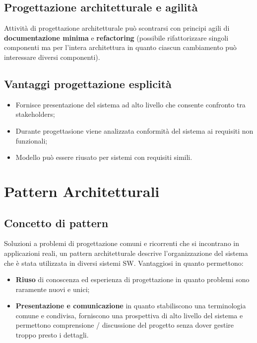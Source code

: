 \documentclass{article}
\begin{document}
    \subsection{Progettazione architetturale e agilità}
      Attività di progettazione architetturale può scontrarsi con principi agili di \textbf{documentazione minima} e \textbf{refactoring} (possibile rifattorizzare singoli componenti ma per l'intera architettura in quanto ciascun cambiamento può interessare diversi componenti).
    \subsection{Vantaggi progettazione esplicità}
      \begin{itemize}
          \item Fornisce presentazione del sistema ad alto livello che consente confronto tra stakeholders;
          \item Durante progettasione viene analizzata conformità del sistema ai requisiti non funzionali;
          \item Modello può essere riusato per sistemi con requisiti simili.
      \end{itemize}
  \section{Pattern Architetturali}
    \subsection{Concetto di pattern}
      Soluzioni a problemi di progettazione comuni e ricorrenti che si incontrano in applicazioni reali, un pattern architetturale descrive l'organizzazione del sistema che è stata utilizzata in diversi sistemi SW. Vantaggiosi in quanto permettono:
      \begin{itemize}
          \item \textbf{Riuso} di conoscenza ed esperienza di progettazione in quanto problemi sono raramente nuovi e unici;
          \item \textbf{Presentazione e comunicazione} in quanto stabiliscono una terminologia comune e condivisa, forniscono una prospettiva di alto livello del sistema e permettono comprensione / discussione del progetto senza dover gestire troppo presto i dettagli.
      \end{itemize}
\end{document}
